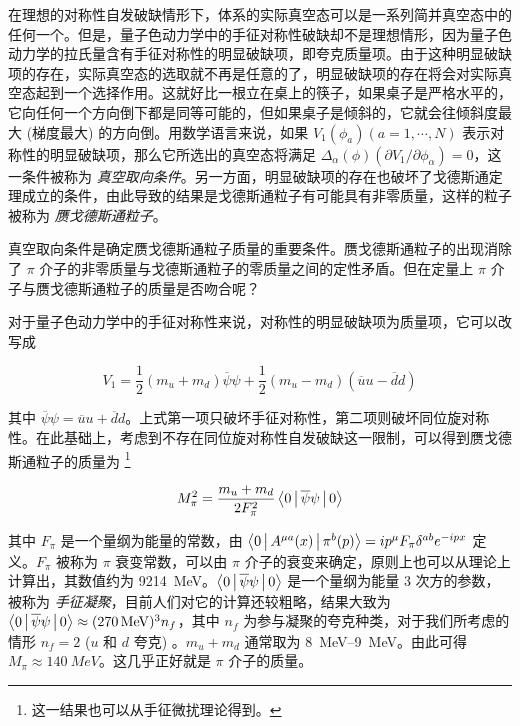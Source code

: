 在理想的对称性自发破缺情形下，体系的实际真空态可以是一系列简并真空态中的任何一个。但是，量子色动力学中的手征对称性破缺却不是理想情形，因为量子色动力学的拉氏量含有手征对称性的明显破缺项，即夸克质量项。由于这种明显破缺项的存在，实际真空态的选取就不再是任意的了，明显破缺项的存在将会对实际真空态起到一个选择作用。这就好比一根立在桌上的筷子，如果桌子是严格水平的，它向任何一个方向倒下都是同等可能的，但如果桌子是倾斜的，它就会往倾斜度最大 (梯度最大) 的方向倒。用数学语言来说，如果 $V_1(\phi_a) (a=1, \cdots, N)$ 表示对称性的明显破缺项，那么它所选出的真空态将满足 $\Delta_\alpha(\phi) (\partial V_1/\partial \phi_\alpha)=0$，这一条件被称为 \emph{真空取向条件}。另一方面，明显破缺项的存在也破坏了戈德斯通定理成立的条件，由此导致的结果是戈德斯通粒子有可能具有非零质量，这样的粒子被称为 \emph{赝戈德斯通粒子}。

真空取向条件是确定赝戈德斯通粒子质量的重要条件。赝戈德斯通粒子的出现消除了 $\pi$ 介子的非零质量与戈德斯通粒子的零质量之间的定性矛盾。但在定量上 $\pi$ 介子与赝戈德斯通粒子的质量是否吻合呢？

对于量子色动力学中的手征对称性来说，对称性的明显破缺项为质量项，它可以改写成

\begin{equation}
    V_1 = \frac{1}{2} (m_u+m_d) \overline{\psi} \psi + \frac{1}{2} (m_u-m_d) (\overline{u}u-\overline{d}d)
\end{equation}

\noindent 其中 $\overline{\psi}\psi=\overline{u}u+\overline{d}d$。上式第一项只破坏手征对称性，第二项则破坏同位旋对称性。在此基础上，考虑到不存在同位旋对称性自发破缺这一限制，可以得到赝戈德斯通粒子的质量为 \footnote{这一结果也可以从手征微扰理论得到。}

\begin{equation}
    M_{\pi}^2 = \frac{m_u+m_d}{2 F_{\pi}^2} \Braket{ 0 | \overline{\psi}\psi | 0}
\end{equation}

\noindent 其中 $F_\pi$ 是一个量纲为能量的常数，由 $\Braket{ 0 | A^{\mu a}(x) | \pi^b(p) } = i p^\mu F_\pi \delta^{ab} e^{-ipx}$ 定义。$F_\pi$ 被称为 $\pi$ 衰变常数，可以由 $\pi$ 介子的衰变来确定，原则上也可以从理论上计算出，其数值约为 \qty{9214}{MeV}。$\Braket{ 0 | \overline{\psi}\psi | 0 }$ 是一个量纲为能量 $3$ 次方的参数，被称为 \emph{手征凝聚}，目前人们对它的计算还较粗略，结果大致为 $\Braket{ 0 | \overline{\psi}\psi | 0 } \approx (\qty{270}{MeV})^3 n_f$，其中 $n_f$ 为参与凝聚的夸克种类，对于我们所考虑的情形 $n_f=2$ ($u$ 和 $d$ 夸克) 。$m_u+m_d$ 通常取为 \qtyrange{8}{9}{MeV}。由此可得 $M_\pi\approx\qty{140}{MeV}$。这几乎正好就是 $\pi$ 介子的质量。


